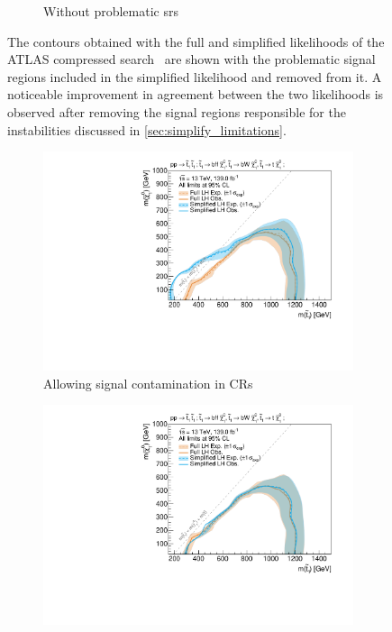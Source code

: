 \begin{figure}[H]
\begin{subfigure}[b]{0.47\textwidth}
		\caption{Without problematic \glspl{sr}\label{fig:exclusion_compressed_CLs_noLabel_v2_withoutCRs}}
	\end{subfigure}\hfill
	\caption{The contours obtained with the full and simplified likelihoods of the ATLAS compressed search~\cite{SUSY-2018-16} are shown with the problematic signal regions  included in the simplified likelihood and  removed from it. A noticeable improvement in agreement between the two likelihoods is observed after removing the signal regions responsible for the instabilities discussed in \cref{sec:simplify_limitations}.}\label{fig:limitations_simplied_compressed}
\end{figure}
\begin{figure}[H]
	\centering
		\captionsetup[subfigure]{aboveskip=-3pt,belowskip=-2pt}
	\begin{subfigure}[b]{0.47\textwidth}
		\centering\includegraphics[width=\textwidth]{exclusion_stop1L_withCRs_noLabel_v3}
		\caption{Allowing signal contamination in CRs\label{fig:exclusion_stop1L_noLabel_v2_withCRs}}
	\end{subfigure}\hfill
	\begin{subfigure}[b]{0.47\textwidth}
		\centering\includegraphics[width=\textwidth]{exclusion_stop1L_noLabel_v3}

\end{subfigure}
\end{figure}
